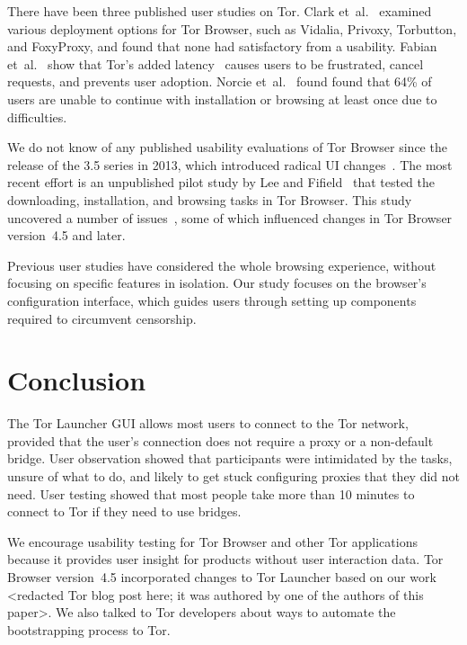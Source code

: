 \documentclass[USenglish,oneside,twocolumn]{article}
\begin{document}
{\color {red} 
There have been three published user studies on Tor. Clark et~al.~\cite{clark2007usability} examined various deployment
options for Tor Browser, such as Vidalia, Privoxy, Torbutton, and FoxyProxy, and found that none had satisfactory from a usability. Fabian et~al.~\cite{fabian2010privately} show that Tor's added
latency~\cite{dingledine2009performance} causes users
to be frustrated, cancel requests, and prevents user adoption. 
Norcie et~al.~\cite{norcie2012eliminating} found found that 
64\% of users are unable to continue with installation or browsing at least once due to difficulties.

We do not know of any published usability evaluations of
Tor Browser since the release of the 3.5 series in 2013, which introduced radical UI changes~\cite{torbrowser-35}.
The most recent effort is an unpublished pilot study by Lee and Fifield~\cite{uxsprint} 
that tested the downloading, installation, and browsing tasks in Tor Browser.  This study uncovered a number of issues~\cite{uxsprint2015-tickets},
some of which influenced changes in Tor Browser version~4.5 and later.

Previous user studies have considered the whole browsing experience,
without focusing on specific features in isolation.
Our study focuses on 
the browser's configuration interface, which guides users through setting up components required to circumvent censorship. 
}

\section{Conclusion} 
\label{sec:conclusion}
The Tor Launcher GUI allows most users to connect to the Tor network, provided that the user's connection does not require a proxy or a non-default bridge. User observation showed that participants were intimidated by the tasks, unsure of what to do, and likely to get stuck configuring proxies that they did not need. User testing showed that most people take more than 10 minutes to connect to Tor if they need to use bridges. 

We encourage usability testing for Tor Browser and other Tor applications because it provides user insight for products without user interaction data. Tor Browser version~4.5 incorporated changes to Tor Launcher based on our work <redacted Tor blog post here; it was authored by one of the authors of this paper>. We also talked to Tor developers about ways to automate the bootstrapping process to Tor. 
\end{document}

